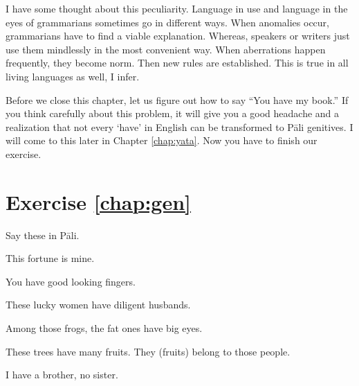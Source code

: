 I have some thought about this peculiarity. Language in use and language in the eyes of grammarians sometimes go in different ways. When anomalies occur, grammarians have to find a viable explanation. Whereas, speakers or writers just use them mindlessly in the most convenient way. When aberrations happen frequently, they become norm. Then new rules are established. This is true in all living languages as well, I infer.

Before we close this chapter, let us figure out how to say ``You have my book.'' If you think carefully about this problem, it will give you a good headache and a realization that not every `have' in English can be transformed to P\=ali genitives. I will come to this later in Chapter \ref{chap:yata}. Now you have to finish our exercise.

\section*{Exercise \ref{chap:gen}}
Say these in P\=ali.
\begin{compactenum}
\item This fortune is mine.
\item You have good looking fingers.
\item These lucky women have diligent husbands.
\item Among those frogs, the fat ones have big eyes.
\item These trees have many fruits. They (fruits) belong to those people.
\item I have a brother, no sister.
\end{compactenum}
